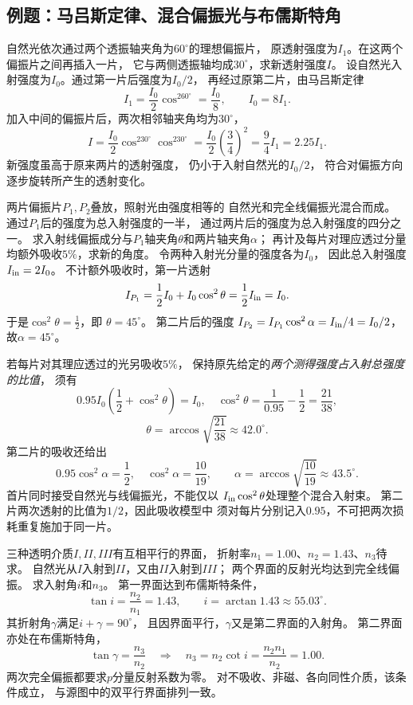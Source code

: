 \subsection{例题：马吕斯定律、混合偏振光与布儒斯特角}

\problemtext 自然光依次通过两个透振轴夹角为$60^\circ$的理想偏振片，
原透射强度为$I_1$。在这两个偏振片之间再插入一片，
它与两侧透振轴均成$30^\circ$，求新透射强度$I$。
\workings
设自然光入射强度为$I_0$。通过第一片后强度为$I_0/2$，
再经过原第二片，由马吕斯定律
\[
 I_1=\frac{I_0}{2}\cos^260^\circ=\frac{I_0}{8},
 \qquad I_0=8I_1.
\]
加入中间的偏振片后，两次相邻轴夹角均为$30^\circ$，
\[
 I=\frac{I_0}{2}\cos^230^\circ\cos^230^\circ
 =\frac{I_0}{2}\left(\frac34\right)^2
 =\boxed{\frac94 I_1=2.25I_1}.
\]
\crosscheck 新强度虽高于原来两片的透射强度，
仍小于入射自然光的$I_0/2$，
符合对偏振方向逐步旋转所产生的透射变化。

\problemtext 两片偏振片$P_1,P_2$叠放，照射光由强度相等的
自然光和完全线偏振光混合而成。
通过$P_1$后的强度为总入射强度的一半，
通过两片后的强度为总入射强度的四分之一。
求入射线偏振成分与$P_1$轴夹角$\theta$和两片轴夹角$\alpha$；
再计及每片对理应透过分量均额外吸收$5\%$，求新的角度。
\workings
令两种入射光分量的强度各为$I_0$，
因此总入射强度$I_{\rm in}=2I_0$。
不计额外吸收时，第一片透射
\[
 I_{P_1}=\frac12I_0+I_0\cos^2\theta
 =\frac12I_{\rm in}=I_0.
\]
于是$\cos^2\theta=\tfrac12$，即
$\boxed{\theta=45^\circ}$。
第二片后的强度
$I_{P_2}=I_{P_1}\cos^2\alpha
 =I_{\rm in}/4=I_0/2$，
故$\boxed{\alpha=45^\circ}$。

若每片对其理应透过的光另吸收$5\%$，
保持原先给定的\emph{两个测得强度占入射总强度的比值}，
须有
\[
 0.95 I_0\left(\frac12+\cos^2\theta\right)=I_0,
 \quad
 \cos^2\theta=\frac1{0.95}-\frac12=\frac{21}{38},
\]
\[
 \boxed{\theta=\arccos\sqrt{\frac{21}{38}}
 \approx42.0^\circ}.
\]
第二片的吸收还给出
\[
 0.95\cos^2\alpha=\frac12,\quad
 \cos^2\alpha=\frac{10}{19},\qquad
 \boxed{\alpha=\arccos\sqrt{\frac{10}{19}}
 \approx43.5^\circ}.
\]
\crosscheck 首片同时接受自然光与线偏振光，不能仅以
$I_{\rm in}\cos^2\theta$处理整个混合入射束。
第二片两次透射的比值为$1/2$，因此吸收模型中
须对每片分别记入$0.95$，不可把两次损耗重复施加于同一片。

\problemtext 三种透明介质$I,II,III$有互相平行的界面，
折射率$n_1=1.00$、$n_2=1.43$、$n_3$待求。
自然光从$I$入射到$II$，又由$II$入射到$III$；
两个界面的反射光均达到完全线偏振。
求入射角$i$和$n_3$。
\workings
第一界面达到布儒斯特条件，
\[
 \tan i=\frac{n_2}{n_1}=1.43,\qquad
 \boxed{i=\arctan1.43\approx55.03^\circ}.
\]
其折射角$\gamma$满足$i+\gamma=90^\circ$，
且因界面平行，$\gamma$又是第二界面的入射角。
第二界面亦处在布儒斯特角，
\[
 \tan\gamma=\frac{n_3}{n_2}
 \quad\Longrightarrow\quad
 n_3=n_2\cot i
 =\frac{n_2n_1}{n_2}=\boxed{1.00}.
\]
\crosscheck 两次完全偏振都要求$p$分量反射系数为零。
对不吸收、非磁、各向同性介质，该条件成立，
与源图中的双平行界面排列一致。

